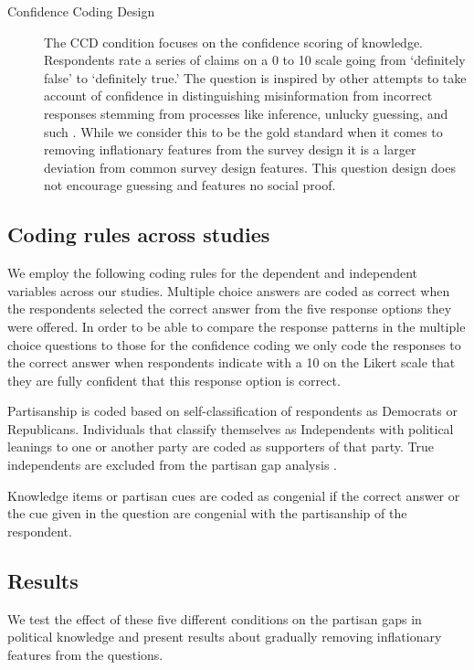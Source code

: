 \documentclass[12pt, letterpaper]{article}
\begin{document}
\begin{description}
  \item[Confidence Coding Design] \label{txt:CCD}The CCD condition focuses on the confidence scoring of knowledge. Respondents rate a series of claims on a 0 to 10 scale going from `definitely false' to `definitely true.' The question is inspired by other attempts to take account of confidence in distinguishing misinformation from incorrect responses stemming from processes like inference, unlucky guessing, and such  \citep[for instance,][]{pasek2015}. While we consider this to be the gold standard when it comes to removing inflationary features from the survey design it is a larger deviation from common survey design features. This question design does not encourage guessing and features no social proof.
\end{description}

\subsection*{Coding rules across studies}


We employ the following coding rules for the dependent and independent variables across our studies. Multiple choice answers are coded as correct when the respondents selected the correct answer from the five response options they were offered. In order to be able to compare the response patterns in the multiple choice questions to those for the confidence coding we only code the responses to the correct answer when respondents indicate with a 10 on the Likert scale that they are fully confident that this response option is correct.

Partisanship is coded based on self-classification of respondents as Democrats or Republicans. Individuals that classify themselves as Independents with political leanings to one or another party are coded as supporters of that party. True independents are excluded from the partisan gap analysis \citep{Bullock2011, klar2016independent}.

Knowledge items or partisan cues are coded as congenial if the correct answer or the cue given in the question are congenial with the partisanship of the respondent.

\subsection*{Results}
We test the effect of these five different conditions on the partisan gaps in political knowledge and present results about gradually removing inflationary features from the questions.
\end{document}

